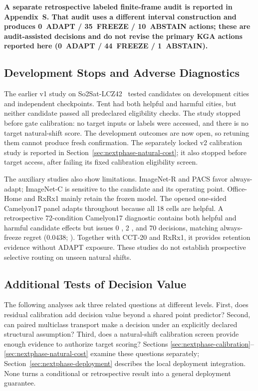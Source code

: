 \textbf{A separate retrospective labeled finite-frame audit is reported in Appendix~S. That audit uses a different interval construction and produces 0~ADAPT / 35~FREEZE / 10~ABSTAIN actions; these are audit-assisted decisions and do not revise the primary KGA actions reported here (0~ADAPT / 44~FREEZE / 1~ABSTAIN).}

\subsection{Development Stops and Adverse Diagnostics}
\label{sec:so2sat-development-stop}

The earlier v1 study on So2Sat-LCZ42~\cite{zhu2020so2sat} tested \SoTwoCandidateCount{} candidates on
\SoTwoDevelopmentCityCount{} development cities and \SoTwoCheckpointCount{} independent
checkpoints. Tent had both helpful and harmful cities, but neither candidate passed all
predeclared eligibility checks. The study stopped before gate calibration: no target inputs or
labels were accessed, and there is no target natural-shift score. The development outcomes are
now open, so retuning them cannot produce fresh confirmation.
The separately locked v2 calibration study is reported in
Section~\ref{sec:nextphase-natural-cost}; it also stopped before target access,
after failing its fixed calibration eligibility screen.

The auxiliary studies also show limitations. ImageNet-R and PACS favor always-adapt;
ImageNet-C is sensitive to the candidate and its operating point. Office-Home and RxRx1 mainly
retain the frozen model. The opened one-sided Camelyon17 panel adapts throughout because all
18 cells are helpful.
A retrospective 72-condition Camelyon17 diagnostic contains both helpful and harmful
candidate effects but issues 0 \adapt, 2 \freeze, and 70 \abstain decisions, matching
always-freeze regret ($0.0438$; ). Together with
CCT-20 and RxRx1, it provides retention evidence without ADAPT exposure. These studies do not
establish prospective selective routing on unseen natural shifts.

\subsection{Additional Tests of Decision Value}
\label{sec:nextphase-comparisons}

The following analyses ask three related questions at different levels. First, does residual
calibration add decision value beyond a shared point predictor? Second, can paired multiclass
transport make a decision under an explicitly declared structural assumption? Third, does a
natural-shift calibration screen provide enough evidence to authorize target scoring? Sections
\ref{sec:nextphase-calibration}--\ref{sec:nextphase-natural-cost} examine these questions
separately; Section~\ref{sec:nextphase-deployment} describes the local deployment integration. None turns a conditional or retrospective result into a general deployment guarantee.

